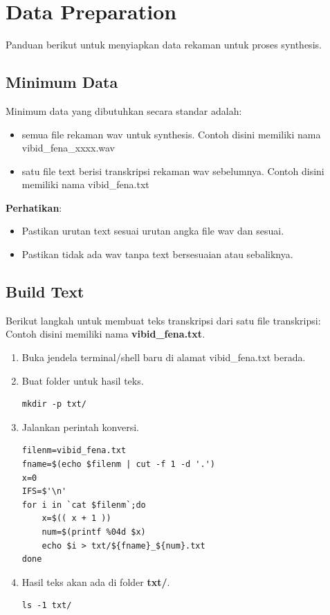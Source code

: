 \documentclass[12pt,]{article}
\begin{document}
	\newpage
	\section{Data Preparation}
	
	Panduan berikut untuk menyiapkan data rekaman untuk proses synthesis.
	
	\subsection{Minimum Data}
	
	Minimum data yang dibutuhkan secara standar adalah:
	\begin{itemize}
		\item semua file rekaman wav untuk synthesis. 
		Contoh disini memiliki nama vibid\_fena\_xxxx.wav
		
		\item satu file text berisi transkripsi rekaman wav sebelumnya.
		Contoh disini memiliki nama vibid\_fena.txt
	\end{itemize}

	\textbf{Perhatikan}:
	\begin{itemize}
		\item Pastikan urutan text sesuai urutan angka file wav dan sesuai.
		\item Pastikan tidak ada wav tanpa text bersesuaian atau sebaliknya.
	\end{itemize}

	\subsection{Build Text}
	
	Berikut langkah untuk membuat teks transkripsi dari satu file transkripsi:
	Contoh disini memiliki nama \textbf{vibid\_fena.txt}.
	\begin{enumerate}
		\item Buka jendela terminal/shell baru di alamat vibid\_fena.txt berada.
		
		\item Buat folder untuk hasil teks.
		\begin{verbatim}
mkdir -p txt/
		\end{verbatim}
		
		\item Jalankan perintah konversi.
		\begin{verbatim}
filenm=vibid_fena.txt
fname=$(echo $filenm | cut -f 1 -d '.')
x=0
IFS=$'\n'
for i in `cat $filenm`;do
	x=$(( x + 1 ))
	num=$(printf %04d $x)
	echo $i > txt/${fname}_${num}.txt
done
		\end{verbatim}
		
		\item Hasil teks akan ada di folder \textbf{txt/}.
		\begin{verbatim}
ls -1 txt/
		\end{verbatim}
		
	\end{enumerate}
	
\end{document}
